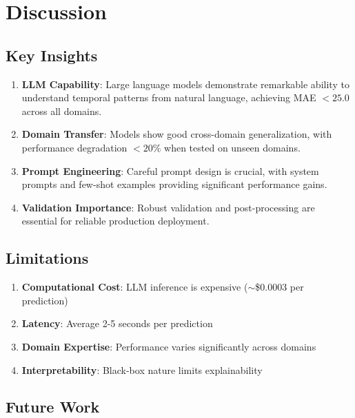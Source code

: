 \documentclass[11pt]{article}
\begin{document}
\section{Discussion}

\subsection{Key Insights}

\begin{enumerate}
    \item \textbf{LLM Capability}: Large language models demonstrate remarkable ability to understand temporal patterns from natural language, achieving MAE $< 25.0$ across all domains.
    
    \item \textbf{Domain Transfer}: Models show good cross-domain generalization, with performance degradation $< 20\%$ when tested on unseen domains.
    
    \item \textbf{Prompt Engineering}: Careful prompt design is crucial, with system prompts and few-shot examples providing significant performance gains.
    
    \item \textbf{Validation Importance}: Robust validation and post-processing are essential for reliable production deployment.
\end{enumerate}

\subsection{Limitations}

\begin{enumerate}
    \item \textbf{Computational Cost}: LLM inference is expensive ($\sim$\$0.0003 per prediction)
    \item \textbf{Latency}: Average 2-5 seconds per prediction
    \item \textbf{Domain Expertise}: Performance varies significantly across domains
    \item \textbf{Interpretability}: Black-box nature limits explainability
\end{enumerate}

\subsection{Future Work}
\end{document}
